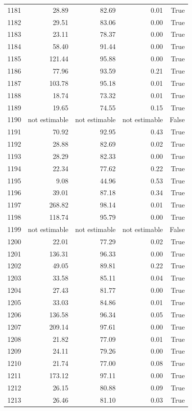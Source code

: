 \begin{longtable}{rrrrr}
1181 & 28.89 & 82.69 & 0.01 & True \\
1182 & 29.51 & 83.06 & 0.00 & True \\
1183 & 23.11 & 78.37 & 0.00 & True \\
1184 & 58.40 & 91.44 & 0.00 & True \\
1185 & 121.44 & 95.88 & 0.00 & True \\
1186 & 77.96 & 93.59 & 0.21 & True \\
1187 & 103.78 & 95.18 & 0.01 & True \\
1188 & 18.74 & 73.32 & 0.01 & True \\
1189 & 19.65 & 74.55 & 0.15 & True \\
1190 & not estimable & not estimable & not estimable & False \\
1191 & 70.92 & 92.95 & 0.43 & True \\
1192 & 28.88 & 82.69 & 0.02 & True \\
1193 & 28.29 & 82.33 & 0.00 & True \\
1194 & 22.34 & 77.62 & 0.22 & True \\
1195 & 9.08 & 44.96 & 0.53 & True \\
1196 & 39.01 & 87.18 & 0.34 & True \\
1197 & 268.82 & 98.14 & 0.01 & True \\
1198 & 118.74 & 95.79 & 0.00 & True \\
1199 & not estimable & not estimable & not estimable & False \\
1200 & 22.01 & 77.29 & 0.02 & True \\
1201 & 136.31 & 96.33 & 0.00 & True \\
1202 & 49.05 & 89.81 & 0.22 & True \\
1203 & 33.58 & 85.11 & 0.04 & True \\
1204 & 27.43 & 81.77 & 0.00 & True \\
1205 & 33.03 & 84.86 & 0.01 & True \\
1206 & 136.58 & 96.34 & 0.05 & True \\
1207 & 209.14 & 97.61 & 0.00 & True \\
1208 & 21.82 & 77.09 & 0.01 & True \\
1209 & 24.11 & 79.26 & 0.00 & True \\
1210 & 21.74 & 77.00 & 0.08 & True \\
1211 & 173.12 & 97.11 & 0.00 & True \\
1212 & 26.15 & 80.88 & 0.09 & True \\
1213 & 26.46 & 81.10 & 0.03 & True \\

\end{longtable}
